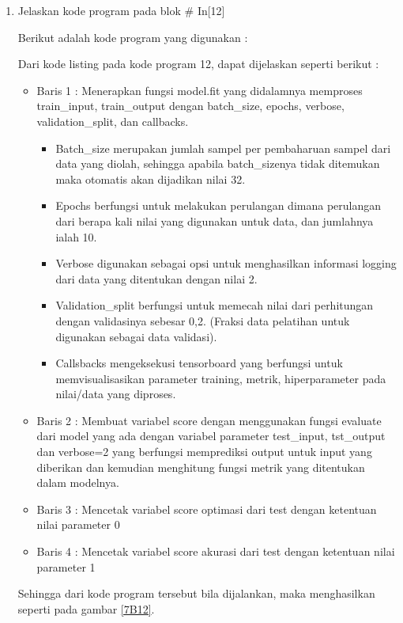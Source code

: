 \begin{enumerate}
\item Jelaskan kode program pada blok \# In[12]
	\par Berikut adalah kode program yang digunakan :
	
	\par Dari kode listing pada kode program 12, dapat dijelaskan seperti berikut :
	\begin{itemize}
	\item Baris 1	: Menerapkan fungsi model.fit yang didalamnya memproses train\_input, train\_output dengan batch\_size, epochs, verbose, validation\_split, dan callbacks.
		\begin{itemize}
		\item Batch\_size merupakan jumlah sampel per pembaharuan sampel dari data yang diolah, sehingga apabila batch\_sizenya tidak ditemukan maka otomatis akan dijadikan nilai 32.
		\item Epochs berfungsi untuk melakukan perulangan dimana perulangan dari berapa kali nilai yang digunakan untuk data, dan jumlahnya ialah 10.
		\item Verbose digunakan sebagai opsi untuk menghasilkan informasi logging dari data yang ditentukan dengan nilai 2.
		\item Validation\_split berfungsi untuk memecah nilai dari perhitungan dengan validasinya sebesar 0,2. (Fraksi data pelatihan untuk digunakan sebagai data validasi).
		\item Callsbacks mengeksekusi tensorboard yang berfungsi untuk memvisualisasikan parameter training, metrik, hiperparameter pada nilai/data yang diproses.
		\end{itemize}	
	\item Baris 2	: Membuat variabel score dengan menggunakan fungsi evaluate dari model yang ada dengan variabel parameter test\_input, tst\_output dan verbose=2 yang berfungsi memprediksi output untuk input yang diberikan dan kemudian menghitung fungsi metrik yang ditentukan dalam modelnya.
	\item Baris 3	: Mencetak variabel score optimasi dari test dengan ketentuan nilai parameter 0
	\item Baris 4	: Mencetak variabel score akurasi dari test dengan ketentuan nilai parameter 1
	\end{itemize}
	\par Sehingga dari kode program tersebut bila dijalankan, maka menghasilkan seperti pada gambar \ref{7B12}.
		\begin{figure}[!hbtp]

\end{figure}
\end{enumerate}
